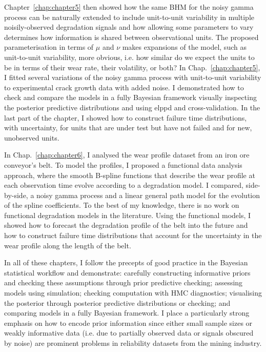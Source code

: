 Chapter~\ref{chap:chapter5} then showed how the same BHM for the noisy gamma process can be naturally extended to include unit-to-unit variability in multiple noisily-observed degradation signals and how allowing some parameters to vary determines how information is shared between observational units. The proposed parameterisation in terms of $\mu$ and $\nu$ makes expansions of the model, such as unit-to-unit variability, more obvious, i.e. how similar do we expect the units to be in terms of their wear rate, their volatility, or both? In Chap.~\ref{chap:chapter5}, I fitted several variations of the noisy gamma process with unit-to-unit variability to experimental crack growth data with added noise. I demonstrated how to check and compare the models in a fully Bayesian framework visually inspecting the posterior predictive distributions and using elppd and cross-validation. In the last part of the chapter, I showed how to construct failure time distributions, with uncertainty, for units that are under test but have not failed and for new, unobserved units.

In Chap.~\ref{chap:chapter6}, I analysed the wear profile dataset from an iron ore conveyor's belt. To model the profiles, I proposed a functional data analysis approach, where the smooth B-spline functions that describe the wear profile at each observation time evolve according to a degradation model. I compared, side-by-side, a noisy gamma process and a linear general path model for the evolution of the spline coefficients. To the best of my knowledge, there is no work on functional degradation models in the literature. Using the functional models, I showed how to forecast the degradation profile of the belt into the future and how to construct failure time distributions that account for the uncertainty in the wear profile along the length of the belt.

In all of these chapters, I follow the precepts of good practice in the Bayesian statistical workflow and demonstrate: carefully constructing informative priors and checking these assumptions through prior predictive checking; assessing models using simulation; checking computation with HMC diagnostics; visualising the posterior through posterior predictive distributions or checking; and comparing models in a fully Bayesian framework. I place a particularly strong emphasis on how to encode prior information since either small sample sizes or weakly informative data (i.e. due to partially observed data or signals obscured by noise) are prominent problems in reliability datasets from the mining industry.


